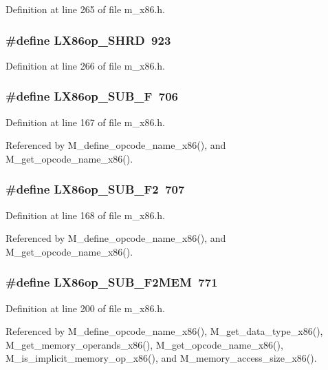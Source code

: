 Definition at line 265 of file m\_\-x86.h.
\subsubsection{\setlength{\rightskip}{0pt plus 5cm}\#define LX86op\_\-SHRD~923}\label{m__x86_8h_be07060128d5301a3c299412a3cb6ece}




Definition at line 266 of file m\_\-x86.h.
\subsubsection{\setlength{\rightskip}{0pt plus 5cm}\#define LX86op\_\-SUB\_\-F~706}\label{m__x86_8h_1c5a78146e0ecdc6214a17a0a704e0ea}




Definition at line 167 of file m\_\-x86.h.

Referenced by M\_\-define\_\-opcode\_\-name\_\-x86(), and M\_\-get\_\-opcode\_\-name\_\-x86().
\subsubsection{\setlength{\rightskip}{0pt plus 5cm}\#define LX86op\_\-SUB\_\-F2~707}\label{m__x86_8h_2155f561ae5a6bd8a0cd3ab3da957ff3}




Definition at line 168 of file m\_\-x86.h.

Referenced by M\_\-define\_\-opcode\_\-name\_\-x86(), and M\_\-get\_\-opcode\_\-name\_\-x86().
\subsubsection{\setlength{\rightskip}{0pt plus 5cm}\#define LX86op\_\-SUB\_\-F2MEM~771}\label{m__x86_8h_f526786324e940f69f4d29f0397bb974}




Definition at line 200 of file m\_\-x86.h.

Referenced by M\_\-define\_\-opcode\_\-name\_\-x86(), M\_\-get\_\-data\_\-type\_\-x86(), M\_\-get\_\-memory\_\-operands\_\-x86(), M\_\-get\_\-opcode\_\-name\_\-x86(), M\_\-is\_\-implicit\_\-memory\_\-op\_\-x86(), and M\_\-memory\_\-access\_\-size\_\-x86().

